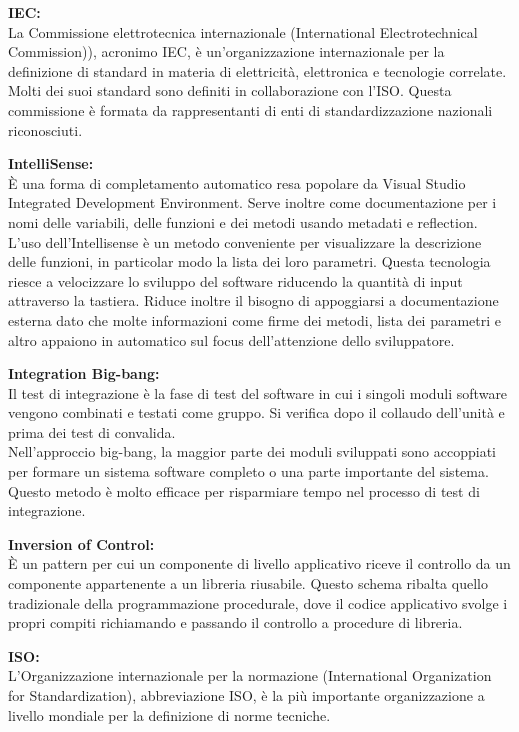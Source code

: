 \documentclass[a4paper, oneside, openany, dvipsnames, table]{article}
\begin{document}
\textbf{IEC:}\\	La Commissione elettrotecnica internazionale (International Electrotechnical Commission)), 
acronimo IEC, è un'organizzazione internazionale 
per la definizione di standard in materia di elettricità, elettronica e tecnologie correlate. Molti dei suoi standard sono 
definiti in collaborazione con l'ISO. Questa commissione è formata da 
rappresentanti di enti di standardizzazione nazionali riconosciuti.

\textbf{IntelliSense:}\\	\`E una forma di completamento automatico resa popolare da Visual Studio Integrated Development Environment.
 Serve inoltre come documentazione per i nomi delle variabili, delle funzioni e dei metodi usando  metadati e reflection. L'uso dell'Intellisense è un metodo conveniente per visualizzare la descrizione delle funzioni, in particolar modo la lista dei loro parametri. Questa tecnologia riesce a velocizzare  lo sviluppo del software riducendo la quantità di input attraverso la tastiera.  Riduce inoltre il bisogno di appoggiarsi a documentazione esterna dato che molte informazioni come firme dei metodi, lista dei parametri e altro appaiono in automatico sul focus dell'attenzione dello sviluppatore.

\textbf{Integration Big-bang:}\\Il test di integrazione è la fase di test del software in cui i singoli 
moduli software vengono combinati e testati come gruppo. Si verifica dopo il collaudo dell'unità e prima 
dei test di convalida.
\\Nell'approccio big-bang, la maggior parte dei moduli sviluppati sono accoppiati per formare un 
sistema software completo o una parte importante del sistema.
 Questo metodo è molto efficace per risparmiare tempo nel processo di test di integrazione. 

\textbf{Inversion of Control:}\\	\`E un pattern per cui un componente di livello applicativo riceve il controllo da un componente appartenente a un libreria riusabile. Questo schema ribalta quello tradizionale della programmazione procedurale, dove il codice applicativo svolge i propri compiti richiamando e passando il controllo a procedure di libreria.

\textbf{ISO:}\\L'Organizzazione internazionale per la normazione 
(International Organization for Standardization), abbreviazione ISO, è la più importante organizzazione a livello mondiale per la definizione di norme tecniche.
\end{document}
